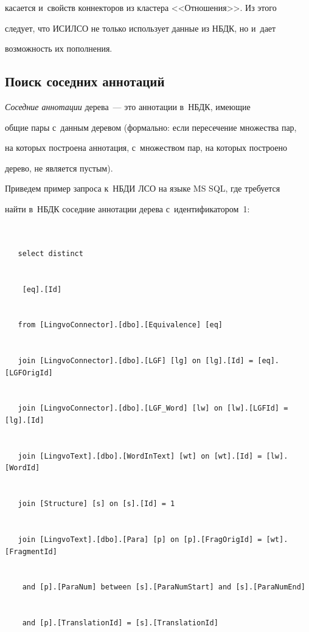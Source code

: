 касается и~свойств коннекторов из кластера <<Отношения>>. Из этого 


следует, что \mbox{ИСИЛСО} не только использует данные из НБДК, но и~дает 


возможность их пополнения.


  


  \subsection{Поиск соседних аннотаций}


  


  \textit{Соседние аннотации} дерева~--- это аннотации в~НБДК, имеющие 


общие пары с~данным деревом (формально: если пересечение множества пар, 


на которых построена аннотация, с~множеством пар, на которых построено 


дерево, не является пустым).


  


  Приведем пример запроса к~НБДИ ЛСО на языке MS SQL, где требуется 


найти в~НБДК соседние аннотации дерева с~идентификатором~1:





\noindent


{\footnotesize


  \begin{verbatim}


   select distinct  


    [eq].[Id]


   from [LingvoConnector].[dbo].[Equivalence] [eq]  


   join [LingvoConnector].[dbo].[LGF] [lg] on [lg].[Id] = [eq].[LGFOrigId]  


   join [LingvoConnector].[dbo].[LGF_Word] [lw] on [lw].[LGFId] = [lg].[Id]  


   join [LingvoText].[dbo].[WordInText] [wt] on [wt].[Id] = [lw].[WordId]  


   join [Structure] [s] on [s].[Id] = 1


   join [LingvoText].[dbo].[Para] [p] on [p].[FragOrigId] = [wt].[FragmentId] 


    and [p].[ParaNum] between [s].[ParaNumStart] and [s].[ParaNumEnd] 


    and [p].[TranslationId] = [s].[TranslationId]  


   \end{verbatim}


   }


